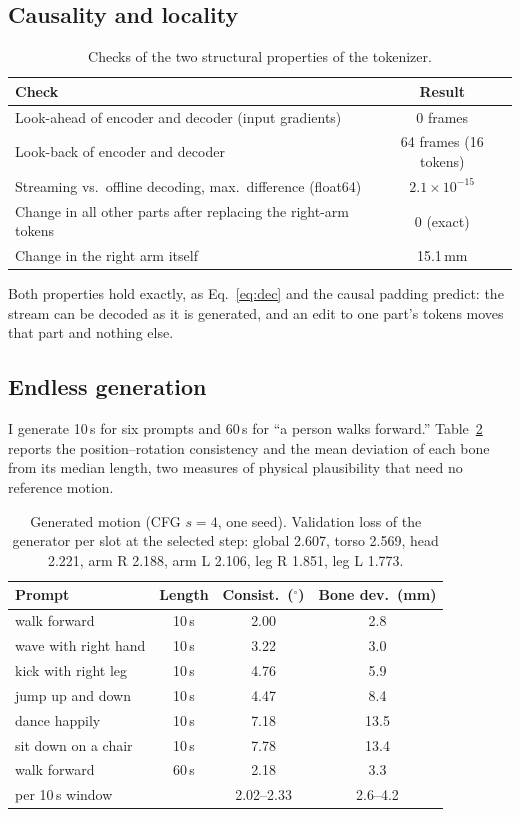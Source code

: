 \documentclass[11pt]{article}
\begin{document}
\subsection{Causality and locality}
\begin{table}[h]
\centering
\caption{Checks of the two structural properties of the tokenizer.}
\label{tab:checks}
\begin{tabular}{lc}
\toprule
Check & Result\\
\midrule
Look-ahead of encoder and decoder (input gradients) & 0 frames\\
Look-back of encoder and decoder & 64 frames (16 tokens)\\
Streaming vs.\ offline decoding, max.\ difference (float64) & $2.1\times10^{-15}$\\
Change in all other parts after replacing the right-arm tokens & $0$ (exact)\\
Change in the right arm itself & 15.1\,mm\\
\bottomrule
\end{tabular}
\end{table}

Both properties hold exactly, as Eq.~\eqref{eq:dec} and the causal padding predict:
the stream can be decoded as it is generated, and an edit to one part's tokens moves that part and
nothing else.

\subsection{Endless generation}
I generate 10\,s for six prompts and 60\,s for ``a person walks forward.''
Table~\ref{tab:gen} reports the position--rotation consistency and the mean deviation of each bone from its
median length, two measures of physical plausibility that need no reference motion.

\begin{table}[h]
\centering
\caption{Generated motion (CFG $s=4$, one seed). Validation loss of the generator per slot at the selected
step: global 2.607, torso 2.569, head 2.221, arm R 2.188, arm L 2.106, leg R 1.851, leg L 1.773.}
\label{tab:gen}
\begin{tabular}{lccc}
\toprule
Prompt & Length & Consist.\ ($^\circ$) & Bone dev.\ (mm)\\
\midrule
walk forward & 10\,s & 2.00 & 2.8\\
wave with right hand & 10\,s & 3.22 & 3.0\\
kick with right leg & 10\,s & 4.76 & 5.9\\
jump up and down & 10\,s & 4.47 & 8.4\\
dance happily & 10\,s & 7.18 & 13.5\\
sit down on a chair & 10\,s & 7.78 & 13.4\\
\midrule
walk forward & 60\,s & 2.18 & 3.3\\
\quad per 10\,s window & & 2.02--2.33 & 2.6--4.2\\
\bottomrule
\end{tabular}
\end{table}
\end{document}
